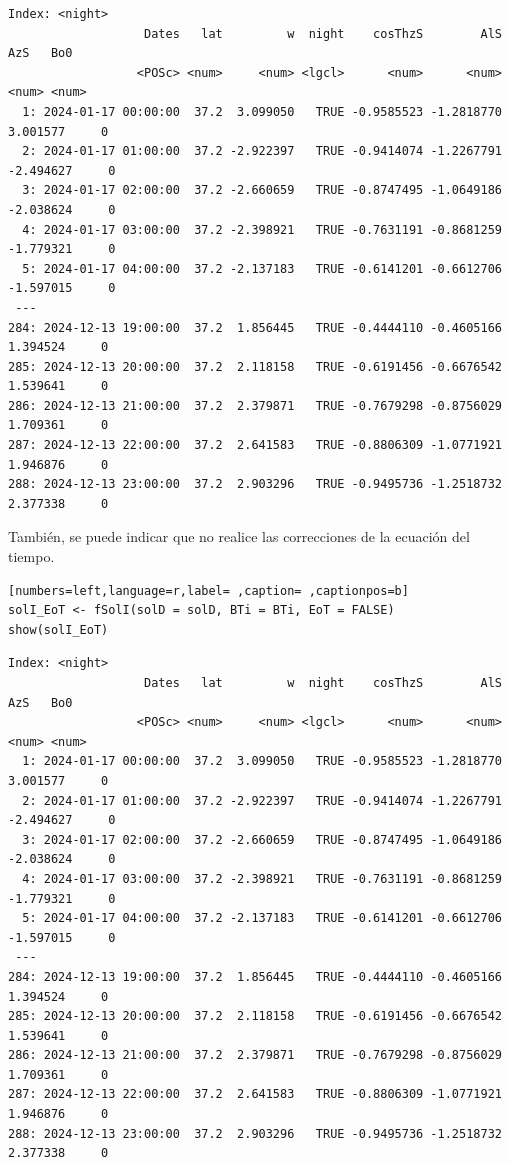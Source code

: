 \begin{verbatim}
Index: <night>
                   Dates   lat         w  night    cosThzS        AlS       AzS   Bo0
                  <POSc> <num>     <num> <lgcl>      <num>      <num>     <num> <num>
  1: 2024-01-17 00:00:00  37.2  3.099050   TRUE -0.9585523 -1.2818770  3.001577     0
  2: 2024-01-17 01:00:00  37.2 -2.922397   TRUE -0.9414074 -1.2267791 -2.494627     0
  3: 2024-01-17 02:00:00  37.2 -2.660659   TRUE -0.8747495 -1.0649186 -2.038624     0
  4: 2024-01-17 03:00:00  37.2 -2.398921   TRUE -0.7631191 -0.8681259 -1.779321     0
  5: 2024-01-17 04:00:00  37.2 -2.137183   TRUE -0.6141201 -0.6612706 -1.597015     0
 ---                                                                                 
284: 2024-12-13 19:00:00  37.2  1.856445   TRUE -0.4444110 -0.4605166  1.394524     0
285: 2024-12-13 20:00:00  37.2  2.118158   TRUE -0.6191456 -0.6676542  1.539641     0
286: 2024-12-13 21:00:00  37.2  2.379871   TRUE -0.7679298 -0.8756029  1.709361     0
287: 2024-12-13 22:00:00  37.2  2.641583   TRUE -0.8806309 -1.0771921  1.946876     0
288: 2024-12-13 23:00:00  37.2  2.903296   TRUE -0.9495736 -1.2518732  2.377338     0
\end{verbatim}

También, se puede indicar que no realice las correcciones de la ecuación del tiempo.
\begin{lstlisting}[numbers=left,language=r,label= ,caption= ,captionpos=b]
solI_EoT <- fSolI(solD = solD, BTi = BTi, EoT = FALSE)
show(solI_EoT)
\end{lstlisting}

\begin{verbatim}
Index: <night>
                   Dates   lat         w  night    cosThzS        AlS       AzS   Bo0
                  <POSc> <num>     <num> <lgcl>      <num>      <num>     <num> <num>
  1: 2024-01-17 00:00:00  37.2  3.099050   TRUE -0.9585523 -1.2818770  3.001577     0
  2: 2024-01-17 01:00:00  37.2 -2.922397   TRUE -0.9414074 -1.2267791 -2.494627     0
  3: 2024-01-17 02:00:00  37.2 -2.660659   TRUE -0.8747495 -1.0649186 -2.038624     0
  4: 2024-01-17 03:00:00  37.2 -2.398921   TRUE -0.7631191 -0.8681259 -1.779321     0
  5: 2024-01-17 04:00:00  37.2 -2.137183   TRUE -0.6141201 -0.6612706 -1.597015     0
 ---                                                                                 
284: 2024-12-13 19:00:00  37.2  1.856445   TRUE -0.4444110 -0.4605166  1.394524     0
285: 2024-12-13 20:00:00  37.2  2.118158   TRUE -0.6191456 -0.6676542  1.539641     0
286: 2024-12-13 21:00:00  37.2  2.379871   TRUE -0.7679298 -0.8756029  1.709361     0
287: 2024-12-13 22:00:00  37.2  2.641583   TRUE -0.8806309 -1.0771921  1.946876     0
288: 2024-12-13 23:00:00  37.2  2.903296   TRUE -0.9495736 -1.2518732  2.377338     0
\end{verbatim}

